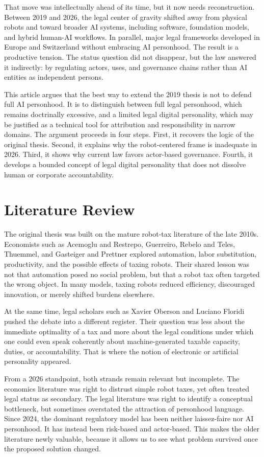 \documentclass[11pt]{article}
\begin{document}
That move was intellectually ahead of its time, but it now needs reconstruction. Between 2019 and 2026, the legal center of gravity shifted away from physical robots and toward broader AI systems, including software, foundation models, and hybrid human-AI workflows. In parallel, major legal frameworks developed in Europe and Switzerland without embracing AI personhood. The result is a productive tension. The status question did not disappear, but the law answered it indirectly: by regulating actors, uses, and governance chains rather than AI entities as independent persons.

This article argues that the best way to extend the 2019 thesis is not to defend full AI personhood. It is to distinguish between full legal personhood, which remains doctrinally excessive, and a limited legal digital personality, which may be justified as a technical tool for attribution and responsibility in narrow domains. The argument proceeds in four steps. First, it recovers the logic of the original thesis. Second, it explains why the robot-centered frame is inadequate in 2026. Third, it shows why current law favors actor-based governance. Fourth, it develops a bounded concept of legal digital personality that does not dissolve human or corporate accountability.

\section{Literature Review}
The original thesis was built on the mature robot-tax literature of the late 2010s. Economists such as Acemoglu and Restrepo, Guerreiro, Rebelo and Teles, Thuemmel, and Gasteiger and Prettner explored automation, labor substitution, productivity, and the possible effects of taxing robots. Their shared lesson was not that automation posed no social problem, but that a robot tax often targeted the wrong object. In many models, taxing robots reduced efficiency, discouraged innovation, or merely shifted burdens elsewhere.

At the same time, legal scholars such as Xavier Oberson and Luciano Floridi pushed the debate into a different register. Their question was less about the immediate optimality of a tax and more about the legal conditions under which one could even speak coherently about machine-generated taxable capacity, duties, or accountability. That is where the notion of electronic or artificial personality appeared.

From a 2026 standpoint, both strands remain relevant but incomplete. The economics literature was right to distrust simple robot taxes, yet often treated legal status as secondary. The legal literature was right to identify a conceptual bottleneck, but sometimes overstated the attraction of personhood language. Since 2024, the dominant regulatory model has been neither laissez-faire nor AI personhood. It has instead been risk-based and actor-based. This makes the older literature newly valuable, because it allows us to see what problem survived once the proposed solution changed.
\end{document}
